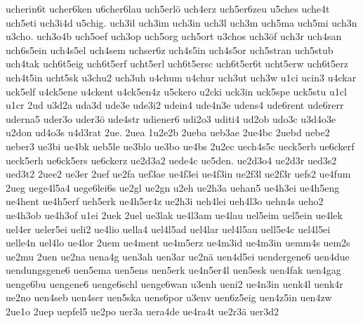 {    ucherin6t
    ucher6ken
    u6cher6lau
    uch5erlö
    uch4erz
    uch5er6zeu
    u5ches
    uche4t
    uch5eti
    uch3i4d
    u5chig.
    uch3il
    uch3im
    uch3in
    uch3l
    uch3m
    uch5ma
    uch5mi
    uch3n
    u3cho.
    uch3o4b
    uch5oef
    uch3op
    uch5org
    uch5ort
    u3chos
    uch3öf
    uch3r
    uch4san
    uch6s5ein
    uch4s5el
    uch4sem
    uchser6z
    uch4s5in
    uch4s5or
    uch5stran
    uch5stub
    uch4tak
    uch6t5eig
    uch6t5erf
    ucht5erl
    uch6t5ersc
    uch6t5er6t
    ucht5erw
    uch6t5erz
    uch4t5in
    ucht5sk
    u3chu2
    uch3uh
    u4chum
    u4chur
    uch3ut
    uch3w
    u1ci
    ucin3
    u4ckar
    uck5elf
    u4ck5ene
    u4ckent
    u4ck5en4z
    u5ckero
    u2cki
    uck3in
    uck5spe
    uck5stu
    u1cl
    u1cr
    2ud
    u3d2a
    uda3d
    ude3e
    ude3i2
    udein4
    ude4n3e
    udens4
    ude6rent
    ude6rerr
    uderna5
    uder3o
    uder3ö
    ude4str
    udiener6
    udi2o3
    uditi4
    ud2ob
    udo3c
    u3d4o3e
    u2don
    ud4o3s
    u4d3rat
    2ue.
    2uea
    1u2e2b
    2ueba
    ueb3ae
    2ue4bc
    2uebd
    uebe2
    ueber3
    ue3bi
    ue4bk
    ueb5le
    ue3blo
    ue3bo
    ue4bs
    2u2ec
    uech4s5c
    ueck5erb
    ue6ckerf
    ueck5erh
    ue6ck5ers
    ue6ckerz
    ue2d3a2
    uede4c
    ue5den.
    ue2d3o4
    ue2d3r
    ued3s2
    ued3t2
    2uee2
    ue3er
    2uef
    ue2fa
    uef3ae
    ue4f3ei
    ue4f3in
    ue2f3l
    ue2f3r
    uefs2
    ue4fum
    2ueg
    uege4l5a4
    uege6lei6s
    ue2gl
    ue2gn
    u2eh
    ue2h3a
    uehan5
    ue4h3ei
    ue4h5eng
    ue4hent
    ue4h5erf
    ueh5erk
    ue4h5er4z
    ue2h3i
    ueh4lei
    ueh4l3o
    uehn4s
    ueho2
    ue4h3ob
    ue4h3of
    u1ei
    2uek
    2uel
    ue3lak
    ue4l3am
    ue4lau
    uel5eim
    uel5ein
    ue4lek
    uel4er
    ueler5ei
    ueli2
    ue4lio
    uella4
    uel4l5ad
    uel4lar
    uel4l5au
    uell5e4c
    uel4l5ei
    uelle4n
    uel4lo
    ue4lor
    2uem
    ue4ment
    ue4m5erz
    ue4m3id
    ue4m3in
    uemm4s
    uem2s
    ue2mu
    2uen
    ue2na
    uena4g
    uen3ah
    uen3ar
    ue2nä
    uen4d5ei
    uendergene6
    uen4due
    uendungsgene6
    uen5ema
    uen5ens
    uen5erk
    ue4n5er4l
    uen5esk
    uen4fak
    uen4gag
    uenge6bu
    uengene6
    uenge6schl
    uenge6wan
    u3enh
    ueni2
    ue4n3in
    uenk4l
    uenk4r
    ue2no
    uen4seb
    uen4ser
    uen5ska
    uens6por
    u3env
    uen6z5eig
    uen4z5in
    uen4zw
    2ue1o
    2uep
    uepfel5
    ue2po
    uer3a
    uera4de
    ue4ra4t
    ue2r3ä
    uer3d2
}
